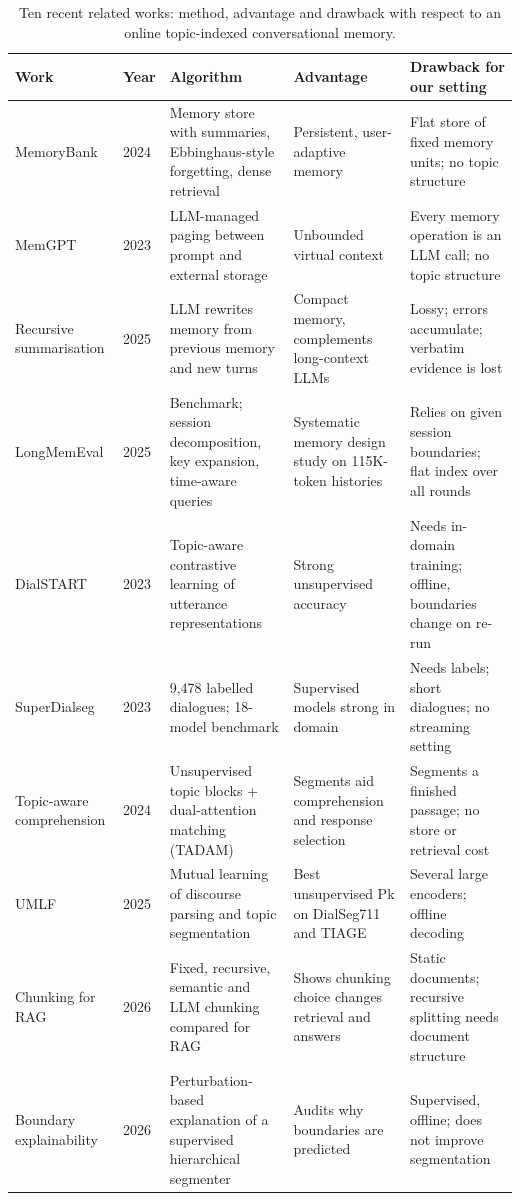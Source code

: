 \documentclass[journal]{IEEEtran}
\begin{document}
\begin{table}[t]
\centering
\caption{Ten recent related works: method, advantage and drawback with respect to an online topic-indexed conversational memory.}
\label{tab:lit}
\footnotesize
\renewcommand{\arraystretch}{1.1}
\setlength{\tabcolsep}{4pt}
\begin{tabular}{@{}p{2.5cm}p{0.6cm}p{4.3cm}p{3.9cm}p{5.4cm}@{}}
\toprule
Work & Year & Algorithm & Advantage & Drawback for our setting \\
\midrule
MemoryBank \cite{zhong2024memorybank} & 2024 & Memory store with summaries, Ebbinghaus-style forgetting, dense retrieval & Persistent, user-adaptive memory & Flat store of fixed memory units; no topic structure \\
MemGPT \cite{packer2023memgpt} & 2023 & LLM-managed paging between prompt and external storage & Unbounded virtual context & Every memory operation is an LLM call; no topic structure \\
Recursive summarisation \cite{wang2025recursive} & 2025 & LLM rewrites memory from previous memory and new turns & Compact memory, complements long-context LLMs & Lossy; errors accumulate; verbatim evidence is lost \\
LongMemEval \cite{wu2025longmemeval} & 2025 & Benchmark; session decomposition, key expansion, time-aware queries & Systematic memory design study on 115K-token histories & Relies on given session boundaries; flat index over all rounds \\
DialSTART \cite{gao2023dialstart} & 2023 & Topic-aware contrastive learning of utterance representations & Strong unsupervised accuracy & Needs in-domain training; offline, boundaries change on re-run \\
SuperDialseg \cite{jiang2023superdialseg} & 2023 & 9,478 labelled dialogues; 18-model benchmark & Supervised models strong in domain & Needs labels; short dialogues; no streaming setting \\
Topic-aware comprehension \cite{ma2024topicaware} & 2024 & Unsupervised topic blocks + dual-attention matching (TADAM) & Segments aid comprehension and response selection & Segments a finished passage; no store or retrieval cost \\
UMLF \cite{xu2025umlf} & 2025 & Mutual learning of discourse parsing and topic segmentation & Best unsupervised Pk on DialSeg711 and TIAGE & Several large encoders; offline decoding \\
Chunking for RAG \cite{lavarec2026chunking} & 2026 & Fixed, recursive, semantic and LLM chunking compared for RAG & Shows chunking choice changes retrieval and answers & Static documents; recursive splitting needs document structure \\
Boundary explainability \cite{nouar2026boundary} & 2026 & Perturbation-based explanation of a supervised hierarchical segmenter & Audits why boundaries are predicted & Supervised, offline; does not improve segmentation \\
\bottomrule
\end{tabular}
\end{table}
\end{document}
